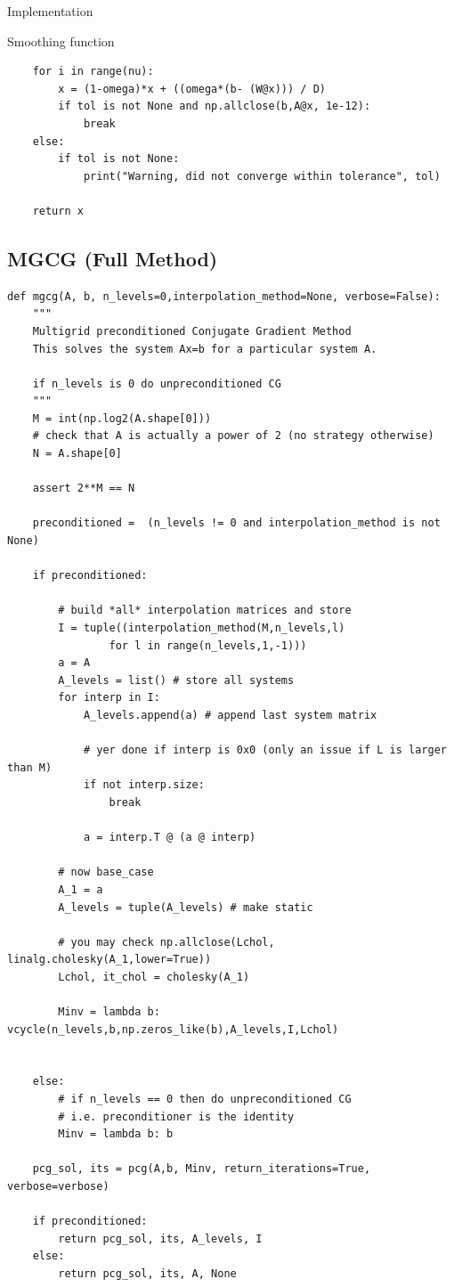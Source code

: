 \documentclass[10pt]{article}
\theoremstyle{definition}
\begin{document}
\begin{section}{Implementation}
\begin{subsection}{Smoothing function}
\begin{lstlisting}
    for i in range(nu):
        x = (1-omega)*x + ((omega*(b- (W@x))) / D)
        if tol is not None and np.allclose(b,A@x, 1e-12):
            break
    else:
        if tol is not None:
            print("Warning, did not converge within tolerance", tol)

    return x
    \end{lstlisting}
\end{subsection}
\clearpage
\subsection{MGCG (Full Method)}
\begin{lstlisting}
def mgcg(A, b, n_levels=0,interpolation_method=None, verbose=False):
    """
    Multigrid preconditioned Conjugate Gradient Method
    This solves the system Ax=b for a particular system A.
    
    if n_levels is 0 do unpreconditioned CG
    """
    M = int(np.log2(A.shape[0]))
    # check that A is actually a power of 2 (no strategy otherwise)
    N = A.shape[0]

    assert 2**M == N
    
    preconditioned =  (n_levels != 0 and interpolation_method is not None) 

    if preconditioned: 
        
        # build *all* interpolation matrices and store
        I = tuple((interpolation_method(M,n_levels,l)
                for l in range(n_levels,1,-1)))
        a = A
        A_levels = list() # store all systems
        for interp in I:
            A_levels.append(a) # append last system matrix

            # yer done if interp is 0x0 (only an issue if L is larger than M)
            if not interp.size:
                break

            a = interp.T @ (a @ interp)

        # now base_case
        A_1 = a
        A_levels = tuple(A_levels) # make static

        # you may check np.allclose(Lchol, linalg.cholesky(A_1,lower=True))
        Lchol, it_chol = cholesky(A_1)

        Minv = lambda b: vcycle(n_levels,b,np.zeros_like(b),A_levels,I,Lchol)    


    else:
        # if n_levels == 0 then do unpreconditioned CG
        # i.e. preconditioner is the identity
        Minv = lambda b: b

    pcg_sol, its = pcg(A,b, Minv, return_iterations=True, verbose=verbose)
    
    if preconditioned:
        return pcg_sol, its, A_levels, I
    else:
        return pcg_sol, its, A, None
\end{lstlisting}
\end{section}
\end{document}
